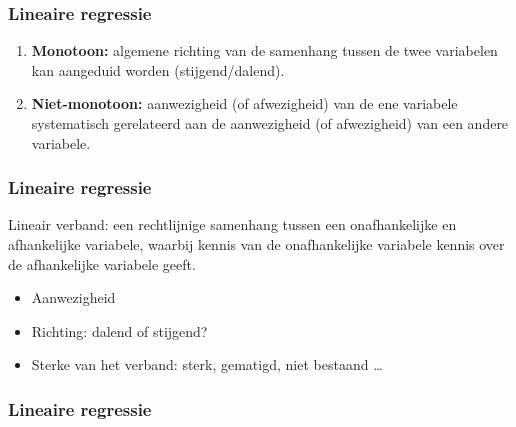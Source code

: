\documentclass{beamer}
\begin{document}
    \begin{frame}
      \frametitle{Lineaire regressie}


      \begin{enumerate}
        \item \textbf{Monotoon:} algemene richting van de samenhang tussen de twee variabelen kan aangeduid worden (stijgend/dalend).
        \item \textbf{Niet-monotoon:}  aanwezigheid (of afwezigheid) van de ene variabele systematisch gerelateerd aan de aanwezigheid (of afwezigheid) van een andere variabele.
      \end{enumerate}
    \end{frame}

    \begin{frame}
      \frametitle{Lineaire regressie}
      Lineair verband: een rechtlijnige samenhang tussen een onafhankelijke en afhankelijke variabele, waarbij kennis van de onafhankelijke variabele kennis over de afhankelijke variabele geeft.
      \begin{itemize}
        \item Aanwezigheid
        \item Richting: dalend of stijgend?
        \item Sterke van het verband: sterk, gematigd, niet bestaand \dots
      \end{itemize}
    \end{frame}

    \begin{frame}
      \frametitle{Lineaire regressie}
      \centering
    \end{frame}
\end{document}
